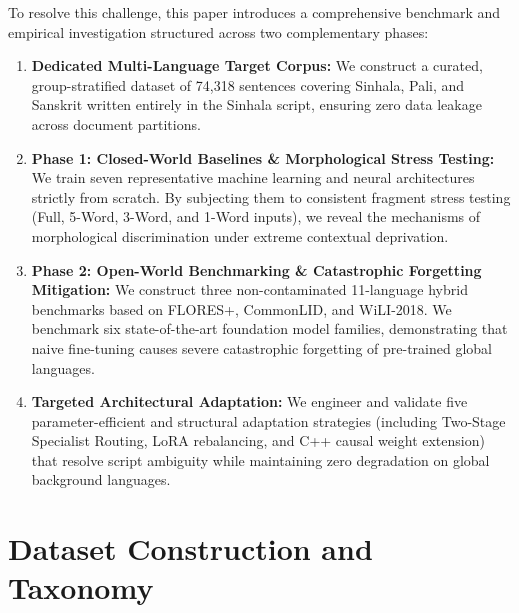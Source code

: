 \documentclass[11pt]{article}
\begin{document}
To resolve this challenge, this paper introduces a comprehensive benchmark and empirical investigation structured across two complementary phases:
\begin{enumerate}
    \item \textbf{Dedicated Multi-Language Target Corpus:} We construct a curated, group-stratified dataset of 74,318 sentences covering Sinhala, Pali, and Sanskrit written entirely in the Sinhala script, ensuring zero data leakage across document partitions.
    \item \textbf{Phase 1: Closed-World Baselines \& Morphological Stress Testing:} We train seven representative machine learning and neural architectures strictly from scratch. By subjecting them to consistent fragment stress testing (Full, 5-Word, 3-Word, and 1-Word inputs), we reveal the mechanisms of morphological discrimination under extreme contextual deprivation.
    \item \textbf{Phase 2: Open-World Benchmarking \& Catastrophic Forgetting Mitigation:} We construct three non-contaminated 11-language hybrid benchmarks based on FLORES+, CommonLID, and WiLI-2018. We benchmark six state-of-the-art foundation model families, demonstrating that naive fine-tuning causes severe catastrophic forgetting of pre-trained global languages.
    \item \textbf{Targeted Architectural Adaptation:} We engineer and validate five parameter-efficient and structural adaptation strategies (including Two-Stage Specialist Routing, LoRA rebalancing, and C++ causal weight extension) that resolve script ambiguity while maintaining zero degradation on global background languages.
    
\end{enumerate}

\section{Dataset Construction and Taxonomy}
\end{document}
